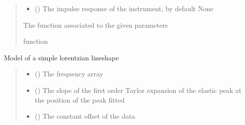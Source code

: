\documentclass[letterpaper,10pt,english]{sphinxmanual}
\begin{document}
\begin{fulllineitems}
\begin{fulllineitems}
\begin{quote}
\begin{description}
\begin{itemize}
\item {} 
\sphinxAtStartPar
{} (\sphinxstyleliteralemphasis{\sphinxupquote{, }}) \textendash{} The impulse response of the instrument, by default None

\end{itemize}

\sphinxAtStartPar
The function associated to the given parameters

\sphinxAtStartPar
function

\end{description}\end{quote}

\end{fulllineitems}


\begin{fulllineitems}
\label{\detokenize{source/_autosummary/HDF5_BLS_treat.Models:HDF5_BLS_treat.Models.DHO_elastic}}
\pysigstartsignatures
\pysiglinewithargsret
{}
{\sphinxparamcomma {}\sphinxparamcomma {}\sphinxparamcomma {}\sphinxparamcomma {}\sphinxparamcomma {}\sphinxparamcomma {}}
{}
\pysigstopsignatures
\sphinxAtStartPar
Model of a simple lorentzian lineshape
\begin{quote}\begin{description}
\begin{itemize}
\item {} 
\sphinxAtStartPar
{} () \textendash{} The frequency array

\item {} 
\sphinxAtStartPar
{} () \textendash{} The slope of the first order Taylor expansion of the elastic peak at the position of the peak fitted

\item {} 
\sphinxAtStartPar
{} () \textendash{} The constant offset of the data


\end{itemize}
\end{description}
\end{quote}
\end{fulllineitems}
\end{fulllineitems}
\end{document}
